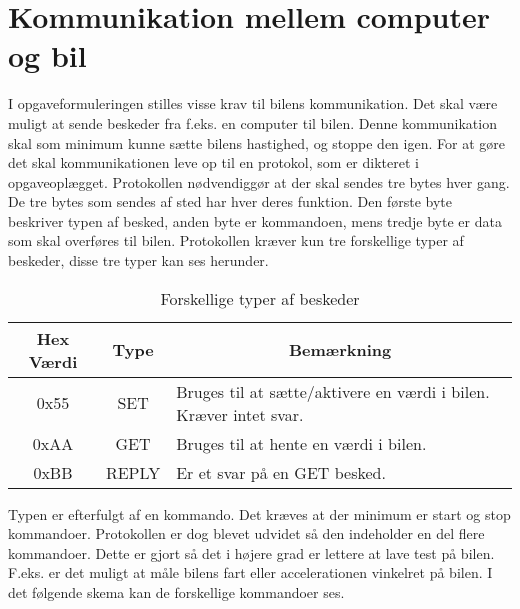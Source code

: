 
\section{Kommunikation mellem computer og bil}
\label{kom_bil}

I opgaveformuleringen stilles visse krav til bilens kommunikation. Det skal være muligt at sende beskeder fra f.eks. en computer til bilen. Denne kommunikation skal som minimum kunne sætte bilens hastighed, og stoppe den igen. For at gøre det skal kommunikationen leve op til en protokol, som er dikteret i opgaveoplægget. Protokollen nødvendiggør at der skal sendes tre bytes hver gang. De tre bytes som sendes af sted har hver deres funktion. Den første byte beskriver typen af besked, anden byte er kommandoen, mens tredje byte er data som skal overføres til bilen. Protokollen kræver kun tre forskellige typer af beskeder, disse tre typer kan ses herunder.

\begin{table}[h]
\begin{tabular}{|c|c|l|}
\hline
Hex Værdi & Type  & \multicolumn{1}{c|}{Bemærkning}                                   \\ \hline
0x55      & SET   & Bruges til at sætte/aktivere en værdi i bilen. Kræver intet svar. \\ \hline
0xAA      & GET   & Bruges til at hente en værdi i bilen.                             \\ \hline
0xBB      & REPLY & Er et svar på en GET besked.                                      \\ \hline
\end{tabular}
\caption{Forskellige typer af beskeder}
\label{forskel_besked}
\end{table}

Typen er efterfulgt af en kommando. Det kræves at der minimum er start og stop kommandoer. Protokollen er dog blevet udvidet så den indeholder en del flere kommandoer. Dette er gjort så det i højere grad er lettere at lave test på bilen. F.eks. er det muligt at måle bilens fart eller accelerationen vinkelret på bilen. I det følgende skema kan de forskellige kommandoer ses.

